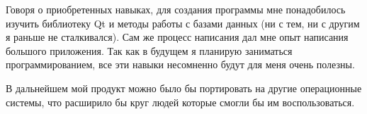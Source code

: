 \documentclass[a4paper,14pt]{extarticle}
\begin{document}
Говоря о приобретенных навыках, для создания программы мне понадобилось изучить
библиотеку Qt и методы работы с базами данных (ни с тем, ни с другим я раньше
не сталкивался). Сам же процесс написания дал мне опыт написания большого
приложения. Так как в будущем я планирую заниматься программированием, все эти
навыки несомненно будут для меня очень полезны.

В дальнейшем мой продукт можно было бы портировать на другие операционные системы,
что расширило бы круг людей которые смогли бы им воспользоваться.
\end{document}
